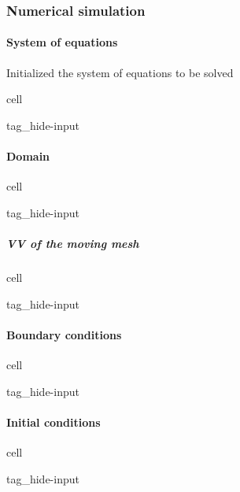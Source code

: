 \documentclass[letterpaper,10pt,english]{jupyterBook}
\begin{document}
\subsubsection{Numerical simulation}
\label{\detokenize{ch/pde/euler-1d-ale-piston:numerical-simulation}}

\paragraph{System of equations}
\label{\detokenize{ch/pde/euler-1d-ale-piston:system-of-equations}}
\sphinxAtStartPar
Initialized the system of equations to be solved

\begin{sphinxuseclass}{cell}
\begin{sphinxuseclass}{tag_hide-input}
\end{sphinxuseclass}
\end{sphinxuseclass}

\paragraph{Domain}
\label{\detokenize{ch/pde/euler-1d-ale-piston:domain}}
\begin{sphinxuseclass}{cell}
\begin{sphinxuseclass}{tag_hide-input}
\end{sphinxuseclass}
\end{sphinxuseclass}

\subparagraph{VV of the moving mesh}
\label{\detokenize{ch/pde/euler-1d-ale-piston:vv-of-the-moving-mesh}}
\begin{sphinxuseclass}{cell}
\begin{sphinxuseclass}{tag_hide-input}
\end{sphinxuseclass}
\end{sphinxuseclass}

\paragraph{Boundary conditions}
\label{\detokenize{ch/pde/euler-1d-ale-piston:boundary-conditions}}
\begin{sphinxuseclass}{cell}
\begin{sphinxuseclass}{tag_hide-input}
\end{sphinxuseclass}
\end{sphinxuseclass}

\paragraph{Initial conditions}
\label{\detokenize{ch/pde/euler-1d-ale-piston:initial-conditions}}
\begin{sphinxuseclass}{cell}
\begin{sphinxuseclass}{tag_hide-input}
\end{sphinxuseclass}
\end{sphinxuseclass}
\end{document}

